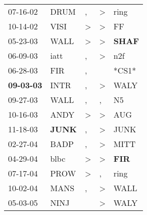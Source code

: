 \begin{supertabular}{p{0.07\textwidth}p{0.06\textwidth}p{0.02\textwidth}p{0.02\textwidth}p{0.06\textwidth}}
          07-16-02\textsuperscript{} &           DRUM\textsuperscript{} &                , &     \textgreater &           ring\textsuperscript{} \\
          10-14-02\textsuperscript{} &           VISI\textsuperscript{} &     \textgreater &     \textgreater &             FF\textsuperscript{} \\
          05-23-03\textsuperscript{} &           WALL\textsuperscript{} &     \textgreater &     \textgreater &  \textbf{SHAF\textsuperscript{}} \\
          06-09-03\textsuperscript{} &           iatt\textsuperscript{} &                , &     \textgreater &            n2f\textsuperscript{} \\
          06-28-03\textsuperscript{} &            FIR\textsuperscript{} &                , &                  &                            *CS1* \\
 \textbf{09-03-03\textsuperscript{}} &           INTR\textsuperscript{} &                , &     \textgreater &           WALY\textsuperscript{} \\
          09-27-03\textsuperscript{} &           WALL\textsuperscript{} &                , &                , &             N5\textsuperscript{} \\
          10-16-03\textsuperscript{} &           ANDY\textsuperscript{} &     \textgreater &     \textgreater &            AUG\textsuperscript{} \\
          11-18-03\textsuperscript{} &  \textbf{JUNK\textsuperscript{}} &                , &     \textgreater &           JUNK\textsuperscript{} \\
          02-27-04\textsuperscript{} &           BADP\textsuperscript{} &                , &     \textgreater &           MITT\textsuperscript{} \\
          04-29-04\textsuperscript{} &           blbc\textsuperscript{} &     \textgreater &     \textgreater &   \textbf{FIR\textsuperscript{}} \\
          07-17-04\textsuperscript{} &           PROW\textsuperscript{} &     \textgreater &                , &           ring\textsuperscript{} \\
          10-02-04\textsuperscript{} &           MANS\textsuperscript{} &                , &     \textgreater &           WALL\textsuperscript{} \\
          05-03-05\textsuperscript{} &           NINJ\textsuperscript{} &                  &     \textgreater &           WALY\textsuperscript{} \\

\end{supertabular}

